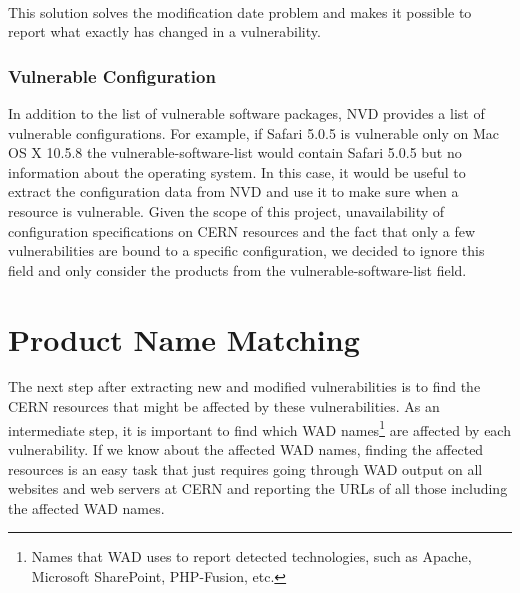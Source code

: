 \paragraph{}
This solution solves the modification date problem and makes it possible to report what exactly has changed in a vulnerability. 

\subsubsection{Vulnerable Configuration}
In addition to the list of vulnerable software packages, NVD provides a list of vulnerable configurations. For example, if Safari 5.0.5 is vulnerable only on Mac OS X 10.5.8 the vulnerable-software-list would contain Safari 5.0.5 but no information about the operating system. In this case, it would be useful to extract the configuration data from NVD and use it to make sure when a resource is vulnerable. Given the scope of this project, unavailability of configuration specifications on CERN resources and the fact that only a few vulnerabilities are bound to a specific configuration, we decided to ignore this field and only consider the products from the vulnerable-software-list field. 




\section{Product Name Matching}
\label{name_matching}
The next step after extracting new and modified vulnerabilities is to find the CERN resources that might be affected by these vulnerabilities. As an intermediate step, it is important to find which WAD names\footnote{Names that WAD uses to report detected technologies, such as Apache, Microsoft SharePoint, PHP-Fusion, etc.} are affected by each vulnerability. If we know about the affected WAD names, finding the affected resources is an easy task that just requires going through WAD output on all websites and web servers at CERN and reporting the URLs of all those including the affected WAD names. 

